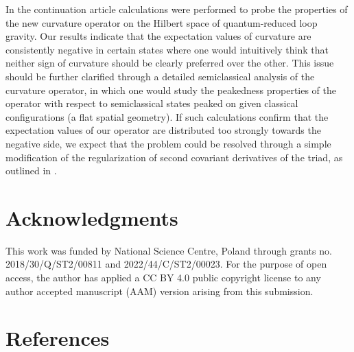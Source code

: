 \documentclass{appolb_edited}
\begin{document}
In the continuation article \cite{Lewandowski:2022xox} calculations were performed to probe the properties of the new curvature operator on the Hilbert space of quantum-reduced loop gravity. Our results indicate that the expectation values of curvature are consistently negative in certain states where one would intuitively think that neither sign of curvature should be clearly preferred over the other. This issue should be further clarified through a detailed semiclassical analysis of the curvature operator, in which one would study the peakedness properties of the operator with respect to semiclassical states peaked on given classical configurations (\eg a flat spatial geometry). If such calculations confirm that the expectation values of our operator are distributed too strongly towards the negative side, we expect that the problem could be resolved through a simple modification of the regularization of second covariant derivatives of the triad, as outlined in \cite{Lewandowski:2022xox}. 

\section*{Acknowledgments}

This work was funded by National Science Centre, Poland through grants no. 2018/30/Q/ST2/00811 and 2022/44/C/ST2/00023. For the purpose of open access, the author has applied a CC BY 4.0 public copyright license to any author accepted manuscript (AAM) version arising from this submission.

\section*{References}

\printbibliography[heading=none]
\end{document}
